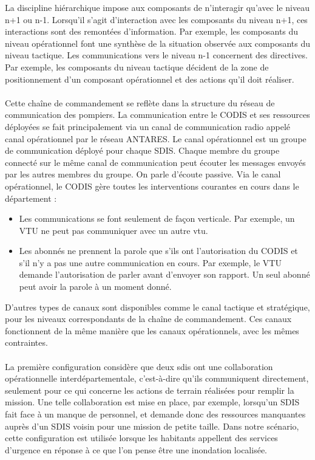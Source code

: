 La discipline hiérarchique impose aux composants de n'interagir qu'avec le niveau n+1 ou n-1. Lorsqu'il
s'agit d'interaction avec les composants du niveau n+1, ces interactions sont des remontées
d'information. Par exemple, les composants du niveau opérationnel font une
synthèse de la situation observée aux composants du niveau tactique. Les
communications vers le niveau n-1 concernent des directives. Par exemple, les
composants du niveau tactique décident de la zone de positionnement d'un
composant opérationnel et des actions qu'il doit réaliser. 
%
\paragraph{}
Cette chaîne de commandement se reflète dans la structure du réseau de
communication des pompiers. La communication entre le CODIS et ses
ressources déployées se fait principalement via
un canal de communication radio appelé canal opérationnel par le réseau ANTARES. Le canal opéra\-tionnel est un groupe de
communication déployé pour chaque SDIS. Chaque membre du groupe connecté
sur le même canal de communication peut écouter les messages envoyés par les autres
membres du groupe. On parle d'écoute passive. Via le canal opérationnel, le CODIS gère
toutes les interventions courantes en cours dans le département :
\begin{itemize}    
\item Les communications se font seulement de façon verticale. Par
exemple, un VTU ne peut pas communiquer avec un autre vtu.
\item Les abonnés ne prennent la parole que s'ils ont l'autorisation du CODIS et
s'il n'y a pas une autre communication en cours. Par exemple, le VTU demande
l'autorisation de parler avant d'envoyer son rapport. Un seul abonné peut avoir
la parole à un moment donné. 
\end{itemize}

D'autres types de canaux sont disponibles comme le canal tactique et
stratégique, pour les niveaux correspondants de la chaîne de commandement. Ces
canaux fonctionnent de la même manière que les canaux opérationnels, avec les mêmes contraintes.

\paragraph{}
La première configuration considère que deux sdis ont une collaboration
opérationnelle inter\-dé\-par\-tementale,
c'est-à-dire qu'ils communiquent directement, seulement pour ce qui concerne les
actions de terrain réalisées pour remplir la mission. Une telle collaboration
est mise en place, par exemple, lorsqu'un SDIS fait face à un manque de
personnel, et demande donc des ressources manquantes auprès d'un SDIS voisin
pour une mission de petite taille. Dans notre scénario, cette configuration est
utilisée lorsque les habitants appellent des services d'urgence en réponse à ce
que l'on pense être une inondation localisée.

